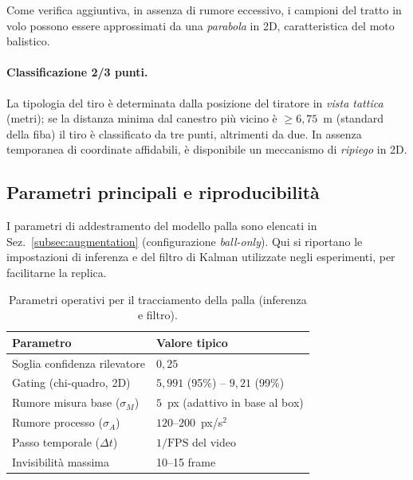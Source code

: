 \documentclass[12pt,a4paper,openright,twoside]{book}
\begin{document}
Come verifica aggiuntiva, in assenza di rumore eccessivo, i campioni del 
tratto in volo possono essere approssimati da una \emph{parabola} in 2D, 
caratteristica del moto balistico.

\paragraph{Classificazione 2/3 punti.}
La tipologia del tiro è determinata dalla posizione del tiratore in 
\emph{vista tattica} (metri); se la distanza minima dal canestro più 
vicino è $\geq 6{,}75$~m (standard della \ac{fiba}) il tiro è classificato da tre 
punti, altrimenti da due. In assenza temporanea di coordinate affidabili, 
è disponibile un meccanismo di \emph{ripiego} in 2D.

\subsection*{Parametri principali e riproducibilità}
\label{subsec:params-palla}
I parametri di addestramento del modello palla sono elencati in 
Sez.~\ref{subsec:augmentation} (configurazione \emph{ball-only}).
Qui si riportano le impostazioni di inferenza e del filtro di Kalman 
utilizzate negli esperimenti, per facilitarne la replica.

\begin{table}[h]
  \centering
  \small
  \caption{Parametri operativi per il tracciamento della palla (inferenza e filtro).}
  \label{tab:params_ball_tracking}
  \begin{tabular}{l l}
    \toprule
    \textbf{Parametro} & \textbf{Valore tipico} \\
    \midrule
    Soglia confidenza rilevatore & $0{,}25$ \\
    Gating (chi-quadro, 2D) & $5{,}991$ (95\%) -- $9{,}21$ (99\%) \\
    Rumore misura base ($\sigma_M$) & $5$~px (adattivo in base al box) \\
    Rumore processo ($\sigma_A$) & $120$--$200$~px/s$^2$ \\
    Passo temporale ($\Delta t$) & $1/\mathrm{FPS}$ del video \\
    Invisibilità massima & 10--15 frame \\
    \bottomrule
  \end{tabular}
\end{table}
\end{document}
